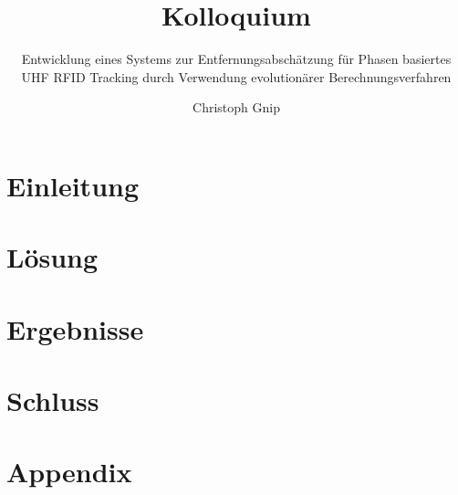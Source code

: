 \documentclass[10pt]{beamer}
\title{Kolloquium}
\subtitle{Entwicklung eines Systems zur
			  Entfernungsabschätzung für
			  Phasen basiertes UHF 
			  RFID Tracking durch 
			  Verwendung evolutionärer
			  Berechnungsverfahren}
\author{Christoph Gnip}
\begin{document}
\maketitle
\frame{\tableofcontents}
\section{Einleitung}

\section{Lösung}

\section{Ergebnisse}

\section{Schluss}

\section*{Appendix}



\end{document}
